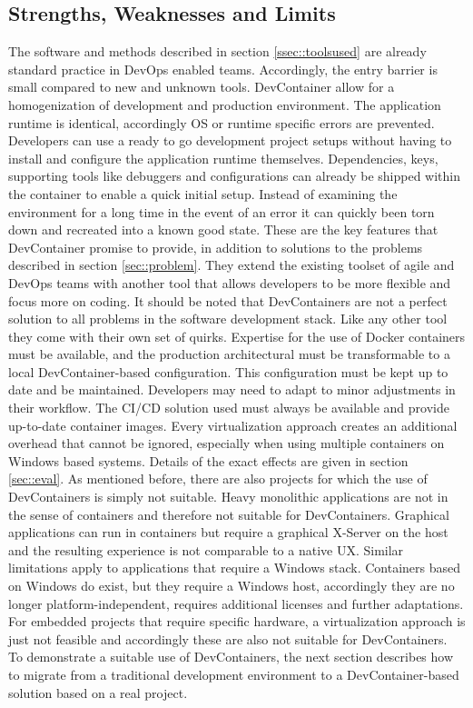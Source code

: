     \subsection{Strengths, Weaknesses and Limits}\label{ssec::limits}
    The software and methods described in section \ref{ssec::toolsused} are already standard practice in DevOps enabled teams. Accordingly, the entry barrier is small compared to new and unknown tools. DevContainer allow for a homogenization of development and production environment. The application runtime is identical, accordingly \ac{OS} or runtime specific errors are prevented. Developers can use a ready to go development project setups without having to install and configure the application runtime themselves. Dependencies, keys, supporting tools like debuggers and configurations can already be shipped within the container to enable a quick initial setup. Instead of examining the environment for a long time in the event of an error it can quickly been torn down and recreated into a known good state. These are the key features that DevContainer promise to provide, in addition to solutions to the problems described in section \ref{sec::problem}. They extend the existing toolset of agile and DevOps teams with another tool that allows developers to be more flexible and focus more on coding.\newline %
    It should be noted that DevContainers are not a perfect solution to all problems in the software development stack. Like any other tool they come with their own set of quirks. Expertise for the use of Docker containers must be available, and the production architectural must be transformable to a local DevContainer-based configuration. This configuration must be kept up to date and be maintained. Developers may need to adapt to minor adjustments in their workflow. The \ac{CI}/\ac{CD} solution used must always be available and provide up-to-date container images. Every virtualization approach creates an additional overhead that cannot be ignored, especially when using multiple containers on Windows based systems. Details of the exact effects are given in section \ref{sec::eval}.\newline
    As mentioned before, there are also projects for which the use of DevContainers is simply not suitable. Heavy monolithic applications are not in the sense of containers and therefore not suitable for DevContainers. Graphical applications can run in containers but require a graphical X-Server on the host and the resulting experience is not comparable to a native \ac{UX}. Similar limitations apply to applications that require a Windows stack. Containers based on Windows do exist, but they require a Windows host, accordingly they are no longer platform-independent, requires additional licenses and further adaptations. For embedded projects that require specific hardware, a virtualization approach is just not feasible and accordingly these are also not suitable for DevContainers.\newline
    To demonstrate a suitable use of DevContainers, the next section describes how to migrate from a traditional development environment to a DevContainer-based solution based on a real project.

